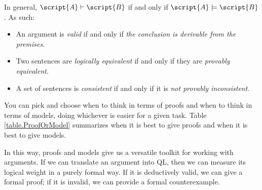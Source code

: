 In general, $\script{A}\vdash\script{B}$ if and only if $\script{A}\models\script{B}$. As such:
\begin{itemize}
\item An argument is \emph{valid} if and only if \emph{the conclusion is derivable from the premises}.
\item Two sentences are \emph{logically equivalent} if and only if they are \emph{provably equivalent}.
\item A set of sentences is \emph{consistent} if and only if it is \emph{not provably inconsistent}.
\end{itemize}
You can pick and choose when to think in terms of proofs and when to think in terms of models, doing whichever is easier for a given task. Table \ref{table.ProofOrModel} summarizes when it is best to give proofs and when it is best to give models.

In this way, proofs and models give us a versatile toolkit for working with arguments. If we can translate an argument into QL, then we can measure its logical weight in a purely formal way. If it is deductively valid, we can give a formal proof; if it is invalid, we can provide a formal counterexample.



